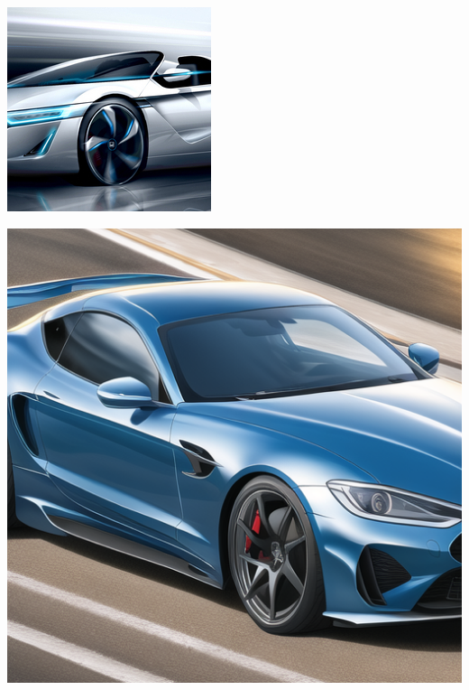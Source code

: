\documentclass[conference]{IEEEtran}
\begin{document}
\begin{center}
\begin{minipage}{0.24\textwidth}
\begin{minipage}{.5\textwidth}
        \label{fig:test2}
    \end{minipage}
  \end{minipage}
  \begin{minipage}{0.24\textwidth}
    \centering
      \begin{minipage}{.5\textwidth}
        \centering
        \includegraphics[width=0.9\linewidth]{sports_car1.jpg}
        \label{fig:test1}
      \end{minipage}%
      \begin{minipage}{.5\textwidth}
        \centering
        \includegraphics[width=0.9\linewidth]{sports_car2.jpg}
        \label{fig:test2}
    \end{minipage}
  \end{minipage}
\end{center}
\end{document}
